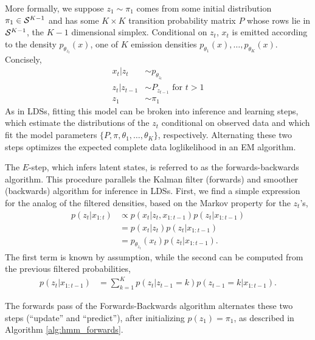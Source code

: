 More formally, we suppose $z_{1} \sim \pi_{1}$ comes from some initial
distribution $\pi_{1} \in \mathcal{S}^{K - 1}$ and has some $K \times K$ transition
probability matrix $P$ whose rows lie in $\mathcal{S}^{K - 1}$, the $K - 1$
dimensional simplex. Conditional on $z_{t}$, $x_{t}$ is emitted according to the
density $p_{\theta_{z_{t}}}\left(x\right)$, one of $K$ emission densities
$p_{\theta_{1}}\left(x\right), \dots, p_{\theta_{K}}\left(x\right)$. Concisely,
\begin{align*}
  x_{t} \vert z_{t} &\sim p_{\theta_{z_{t}}} \\
  z_{t} \vert z_{t - 1} &\sim P_{z_{t - 1}} \text{ for } t > 1 \\
  z_{1} &\sim \pi_{1}
\end{align*}
As in LDSs, fitting this model can be broken into inference and learning steps,
which estimate the distributions of the $z_{t}$ conditional on observed data and
which fit the model parameters $\{P, \pi, \theta_{1}, \dots, \theta_{K}\}$,
respectively. Alternating these two steps optimizes the expected complete data
loglikelihood in an EM algorithm.

The $E$-step, which infers latent states, is referred to as the
forwards-backwards algorithm. This procedure parallels the Kalman filter
(forwards) and smoother (backwards) algorithm for inference in LDSs. First, we
find a simple expression for the analog of the filtered densities, based on the
Markov property for the $z_{t}$'s,
\begin{align*}
  p\left(z_{t} \vert x_{1:t}\right) &\propto p\left(x_{t} \vert z_{t}, x_{1:t - 1}\right) p\left(z_{t} \vert x_{1:t - 1}\right) \\
  &= p\left(x_{t} \vert z_{t}\right) p\left(z_{t} \vert x_{1:t - 1}\right) \\
  &= p_{\theta_{z_{t}}}\left(x_{t}\right)p\left(z_{t} \vert x_{1:t - 1}\right).
\end{align*}
The first term is known by assumption, while the second can be computed from the
previous filtered probabilities,
\begin{align*}
  p\left(z_{t} \vert x_{1:t - 1}\right) &= \sum_{k = 1}^{K} p\left(z_{t} \vert z_{t - 1} = k\right)p\left(z_{t - 1} = k \vert x_{1:t - 1} \right).
\end{align*}

The forwards pass of the Forwards-Backwards algorithm alternates these two steps
(``update'' and ``predict''), after initializing $p\left(z_{1}\right) =
\pi_{1}$, as described in Algorithm \ref{alg:hmm_forwards}.

